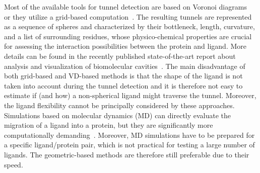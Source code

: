 \documentclass[usletter, 10pt, conference]{ieeeconf} %
\def\C{\mathcal{C}}
\begin{document}
Most of the available tools for tunnel detection are based on Voronoi diagrams~\cite{yaffe2008,caver3} or they utilize a grid-based computation~\cite{sehnal2013mole}.
The resulting tunnels are represented as a sequence of spheres and characterized by their bottleneck, length, curvature, and a list of surrounding residues, whose physico-chemical properties are crucial for assessing the interaction possibilities between the protein and ligand.
More details can be found in the recently published state-of-the-art report about analysis and visualization of biomolecular cavities~\cite{Krone_2016}.
The main disadvantage of both grid-based and VD-based methods is that the shape of the ligand is not taken into account during the tunnel detection and it is therefore not easy to estimate if (and how) a non-spherical ligand might traverse the tunnel.
Moreover, the ligand flexibility cannot be principally considered by these approaches.
Simulations based on molecular dynamics (MD) can directly evaluate the migration of a ligand into a protein, but they are significantly more computationally demanding~\cite{kingsley2014including}. 
Moreover, MD simulations have to be prepared for a specific ligand/protein pair, which is not practical for testing a large number of ligands.
The geometric-based methods are therefore still preferable due to their speed.

\end{document}
